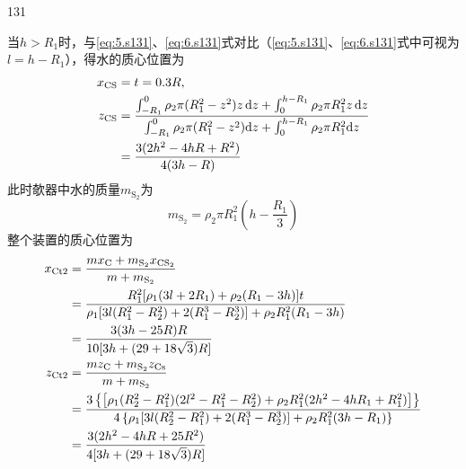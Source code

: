 \begin{solution}{131}
\begin{subsolution}
        当$h > R _ { 1 }$时，与\eqref{eq:5.s131}、\eqref{eq:6.s131}式对比（\eqref{eq:5.s131}、\eqref{eq:6.s131}式中可视为$l = h - R _ { 1 }$），得水的质心位置为
        \begin{align}
            x _ {\mathrm{CS}} &= t = 0.3 R, \label{eq:33.s131} \\
            z _ {\mathrm{CS}} &= \frac {\int_ {- R _ {1}} ^ {0} \rho_ {2} \pi (R _ {1} ^ {2} - z ^ {2}) z \, \mathrm{d} z + \int_ {0} ^ {h - R _ {1}} \rho_ {2} \pi R _ {1} ^ {2} z \, \mathrm{d} z}{\int_ {- R _ {1}} ^ {0} \rho_ {2} \pi (R _ {1} ^ {2} - z ^ {2}) \mathrm{d} z + \int_ {0} ^ {h - R _ {1}} \rho_ {2} \pi R _ {1} ^ {2} \mathrm{d} z} \notag \\
            &= \frac {3 (2 h ^ {2} - 4 h R + R ^ {2})}{4 (3 h - R)} \label{eq:34.s131}
        \end{align}
        此时欹器中水的质量$m _ { \mathrm { S } _ { 2 } }$为
        \begin{equation}
            m _ {\mathrm{S} _ {2}} = \rho_ {2} \pi R _ {1} ^ {2} \left(h - \frac {R _ {1}}{3}\right)
            \label{eq:35.s131}
        \end{equation}
        整个装置的质心位置为
        \begin{align}
            x _ {\mathrm{Ct2}} &= \frac {m x _ {\mathrm{C}} + m _ {\mathrm{S} _ {2}} x _ {\mathrm{CS} _ {2}}}{m + m _ {\mathrm{S} _ {2}}} \notag \\
            &= \frac {R _ {1} ^ {2} [ \rho_ {1} (3 l + 2 R _ {1}) + \rho_ {2} (R _ {1} - 3 h) ] t}{\rho_ {1} [ 3 l (R _ {1} ^ {2} - R _ {2} ^ {2}) + 2 (R _ {1} ^ {3} - R _ {2} ^ {3}) ] + \rho_ {2} R _ {1} ^ {2} (R _ {1} - 3 h)} \notag \\
            &= \frac {3 (3 h - 25 R) R}{10 [ 3 h + (29 + 18 \sqrt {3}) R ]} \label{eq:36.s131} \\
            z _ {\mathrm{Ct2}} &= \frac {m z _ {\mathrm{C}} + m _ {\mathrm{S} _ {2}} z _ {\mathrm{Cs}}}{m + m _ {\mathrm{S} _ {2}}} \notag \\
            &= \frac {3 \left\{\left[ \rho_ {1} (R _ {2} ^ {2} - R _ {1} ^ {2}) (2 l ^ {2} - R _ {1} ^ {2} - R _ {2} ^ {2}) + \rho_ {2} R _ {1} ^ {2} (2 h ^ {2} - 4 h R _ {1} + R _ {1} ^ {2}) \right] \right\}}{4 \left\{\rho_ {1} [ 3 l (R _ {2} ^ {2} - R _ {1} ^ {2}) + 2 (R _ {1} ^ {3} - R _ {2} ^ {3}) ] + \rho_ {2} R _ {1} ^ {2} (3 h - R _ {1}) \right\}} \notag \\
            &= \frac {3 (2 h ^ {2} - 4 h R + 25 R ^ {2})}{4 [ 3 h + (29 + 18 \sqrt {3}) R ]} \label{eq:37.s131}
        \end{align}

\end{subsolution}
\end{solution}
